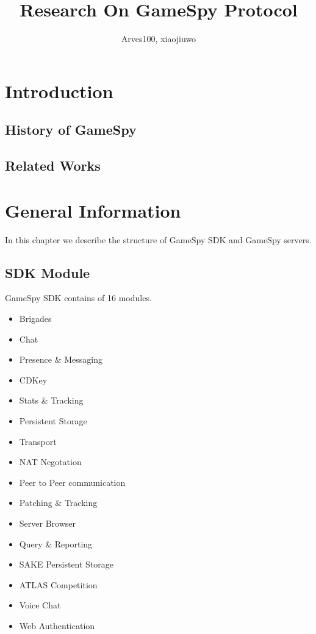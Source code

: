 \documentclass[oneside,titlepage,a4paper]{Definition/retrospy} %
\begin{document}
\title{\Huge\textbf{Research On GameSpy Protocol}} 
\author{Arves100, xiaojiuwo}



\maketitle  %

\tableofcontents  %

\part{Introduction}

\chapter{History of GameSpy}

\chapter{Related Works}


\part{General Information}
In this chapter we describe the structure of GameSpy SDK and GameSpy servers.
\chapter{SDK Module}
GameSpy SDK contains of  16 modules.
	\begin{itemize}
		\item Brigades
		\item Chat
		\item Presence \& Messaging
		\item CDKey
		\item Stats \& Tracking
		\item Persistent Storage
		\item Transport
		\item NAT Negotation
		\item Peer to Peer communication
		\item Patching \& Tracking
		\item Server Browser
		\item Query \& Reporting
		\item SAKE Persistent Storage
		\item ATLAS Competition
		\item Voice Chat
		\item Web Authentication
	\end{itemize}
\end{document}
